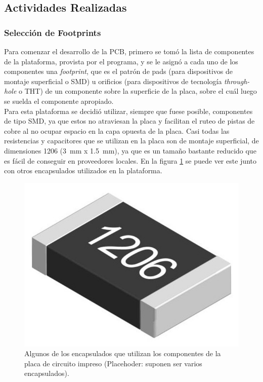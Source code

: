 \subsection{Actividades Realizadas}

\subsubsection{Selección de Footprints}

Para comenzar el desarrollo de la PCB, primero se tomó la lista de componentes de la plataforma, provista por el programa, y se le asignó a cada uno de los componentes una \textit{footprint}, que es el patrón de pads (para dispositivos de montaje superficial o SMD) u orificios (para dispositivos de tecnología \textit{through-hole} o THT) de un componente sobre la superficie de la placa, sobre el cuál luego se suelda el componente apropiado.\\ 

Para esta plataforma se decidió utilizar, siempre que fuese posible, componentes de tipo SMD, ya que estos no atraviesan la placa y facilitan el ruteo de pistas de cobre al no ocupar espacio en la capa opuesta de la placa. Casi todas las resistencias y capacitores que se utilizan en la placa son de montaje superficial, de dimensiones 1206 (\SI[]{3}[]{\milli\metre} x \SI[]{1.5}[]{\milli\metre}), ya que es un tamaño bastante reducido que es fácil de conseguir en proveedores locales. En la figura \ref{fig:encapsulados} se puede ver este junto con otros encapsulados utilizados en la plataforma.\\

\begin{figure}[h]
    \centering
    \includegraphics[scale=0.3]{Imagenes/1206.jpg}
    \caption{Algunos de los encapsulados que utilizan los componentes de la placa de circuito impreso (Placehoder: suponen ser varios encapsulados).}
    \label{fig:encapsulados}
\end{figure}


